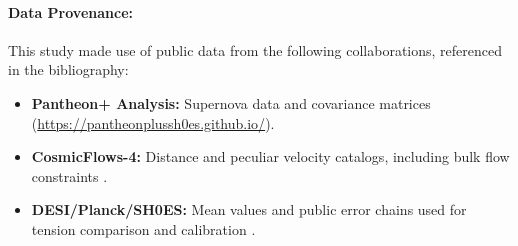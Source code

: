 \documentclass[12pt, a4paper]{article}
\theoremstyle{plain}
\theoremstyle{definition}
\begin{document}
\paragraph{Data Provenance:}
This study made use of public data from the following collaborations, referenced in the bibliography:
\begin{itemize}
    \item \textbf{Pantheon+ Analysis:} Supernova data and covariance matrices \cite{Brout2022} \\ (\url{https://pantheonplussh0es.github.io/}).
    \item \textbf{CosmicFlows-4:} Distance and peculiar velocity catalogs, including bulk flow constraints \cite{Tully2023, Mazurenko2024}.
    \item \textbf{DESI/Planck/SH0ES:} Mean values and public error chains used for tension comparison and calibration \cite{DESI2024, Planck2018, Riess2022}.
\end{itemize}
\end{document}
